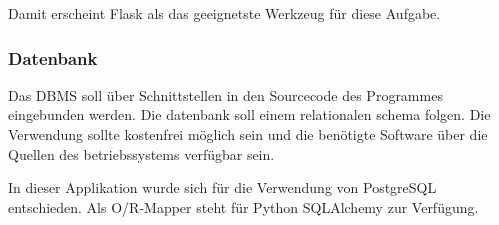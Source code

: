 Damit erscheint Flask als das geeignetste Werkzeug für diese Aufgabe.


\subsubsection{Datenbank}

Das DBMS soll über Schnittstellen in den Sourcecode des Programmes eingebunden werden. Die datenbank soll einem relationalen schema folgen. Die Verwendung sollte kostenfrei möglich sein und die benötigte Software über die Quellen des betriebssystems verfügbar sein. 

In dieser Applikation wurde sich für die Verwendung von PostgreSQL entschieden. Als O/R-Mapper steht für Python SQLAlchemy zur Verfügung.


